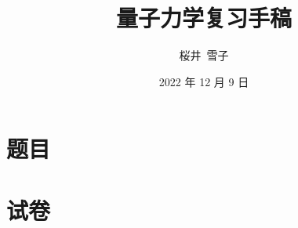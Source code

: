 \documentclass{article}
\title{量子力学复习手稿}
\author{桜井\ 雪子}
\date{2022 年 12 月 9 日}
\begin{document}
\maketitle

\section{题目}



\section{试卷}


\end{document}
